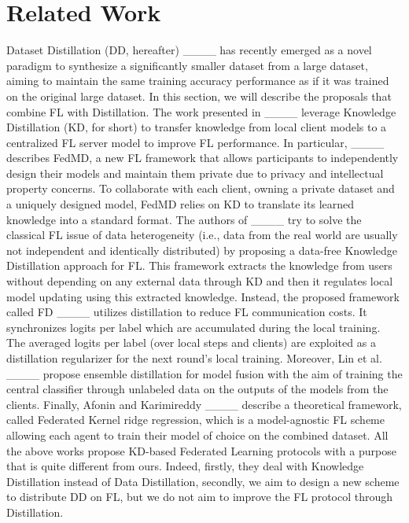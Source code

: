 \section{Related Work}
\label{sec:related}

Dataset Distillation (DD, hereafter) ____ has recently emerged as a novel paradigm to synthesize a significantly
smaller dataset from a large dataset, aiming to maintain the same training accuracy performance as if it was trained on the original large dataset. 
In this section, we will describe the proposals that combine FL with Distillation.
The work presented in ____ leverage Knowledge Distillation (KD, for short) to transfer knowledge from local client models to a centralized FL server model to improve FL performance.
In particular, ____ describes FedMD, a new FL framework that allows participants to independently design their models and maintain them private due to privacy and intellectual property concerns. To collaborate with each client, owning a private dataset and a uniquely designed model, FedMD relies on KD to translate its learned knowledge into a standard format.
The authors of ____ try to solve the classical FL issue of data heterogeneity (i.e., data from the real world are usually not independent and identically distributed) by proposing a data-free Knowledge Distillation approach for FL. This framework extracts the knowledge from users without depending on any external data through KD and then it regulates local model updating using this extracted knowledge.
Instead, the proposed framework called FD ____ utilizes distillation to reduce FL communication costs. It synchronizes logits per label which are accumulated during the local training. The averaged
logits per label (over local steps and clients) are exploited as a distillation regularizer for the next round's local training. Moreover, Lin et al. ____ propose ensemble distillation for model fusion with the aim of training
the central classifier through unlabeled data on the outputs of the models from the clients. 
Finally, Afonin and Karimireddy ____
describe a theoretical framework, called Federated Kernel
ridge regression, which is a model-agnostic FL scheme allowing each agent to train
their model of choice on the combined dataset.
All the above works propose KD-based Federated Learning protocols with a purpose that is quite different from ours. Indeed, firstly, they deal with Knowledge Distillation instead of Data Distillation, secondly, we aim to design a new scheme to distribute DD on FL, but we do not aim to improve the FL protocol through Distillation.

